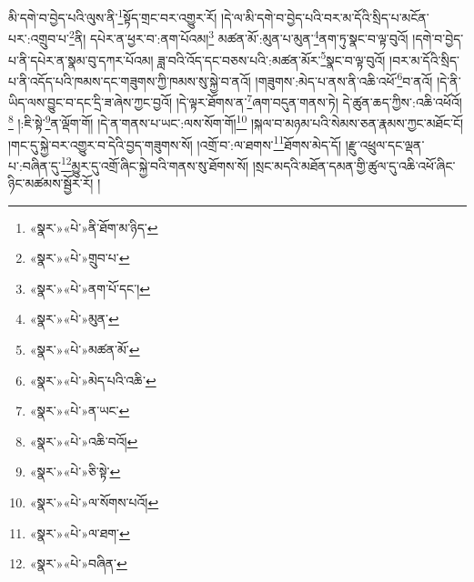 མི་དགེ་བ་བྱེད་པའི་ལུས་ནི་\footnote{«སྣར་»«པེ་»ནི་ཐོག་མ་ཉིད་}སྟོད་གྲང་བར་འགྱུར་རོ། །དེ་ལ་མི་དགེ་བ་བྱེད་པའི་བར་མ་དོའི་སྲིད་པ་མངོན་པར་:འགྲུབ་པ་\footnote{«སྣར་»«པེ་»གྲུབ་པ་}ནི། དཔེར་ན་ཕྱར་བ་:ནག་པོའམ།\footnote{«སྣར་»«པེ་»ནག་པོ་དང་།} མཚན་མོ་:མུན་པ་མུན་\footnote{«སྣར་»«པེ་»མུན་}ནག་ཏུ་སྣང་བ་ལྟ་བུའོ། །དགེ་བ་བྱེད་པ་ནི་དཔེར་ན་སྣམ་བུ་དཀར་པོའམ། ཟླ་བའི་འོད་དང་བཅས་པའི་:མཚན་མོར་\footnote{«སྣར་»«པེ་»མཚན་མོ་}སྣང་བ་ལྟ་བུའོ། །བར་མ་དོའི་སྲིད་པ་ནི་འདོད་པའི་ཁམས་དང་གཟུགས་ཀྱི་ཁམས་སུ་སྐྱེ་བ་ནའོ། །གཟུགས་:མེད་པ་ནས་ནི་འཆི་འཕོ་\footnote{«སྣར་»«པེ་»མེད་པའི་འཆི་}བ་ནའོ། །དེ་ནི་ཡིད་ལས་བྱུང་བ་དང་དྲི་ཟ་ཞེས་ཀྱང་བྱའོ། །དེ་ལྟར་ཐོགས་ན་\footnote{«སྣར་»«པེ་»ན་ཡང་}ཞག་བདུན་གནས་ཏེ། དེ་ཚུན་ཆད་ཀྱིས་:འཆི་འཕོའོ།\footnote{«སྣར་»«པེ་»འཆི་བའོ།} །:ཇི་སྟེ་\footnote{«སྣར་»«པེ་»ཅི་སྟེ་}ན་ལྡོག་གོ། །དེ་ན་གནས་པ་ཡང་:ལས་སོག་གོ།\footnote{«སྣར་»«པེ་»ལ་སོགས་པའོ།} །སྐལ་བ་མཉམ་པའི་སེམས་ཅན་རྣམས་ཀྱང་མཐོང་ངོ། །གང་དུ་སྐྱེ་བར་འགྱུར་བ་དེའི་བྱད་གཟུགས་སོ། །འགྲོ་བ་:ལ་ཐགས་\footnote{«སྣར་»«པེ་»ལ་ཐག་}ཐོགས་མེད་དོ། །རྫུ་འཕྲུལ་དང་ལྡན་པ་:བཞིན་དུ་\footnote{«སྣར་»«པེ་»བཞིན་}མྱུར་དུ་འགྲོ་ཞིང་སྐྱེ་བའི་གནས་སུ་ཐོགས་སོ། །སྲང་མདའི་མཐོན་དམན་གྱི་ཚུལ་དུ་འཆི་འཕོ་ཞིང་ཉིང་མཚམས་སྦྱོར་རོ། །
